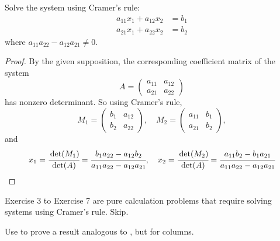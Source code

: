 \begin{exercise} \label{exercise 4.3.2}
Solve the system using Cramer's rule:
\begin{align*}
    a_{11} x_1 + a_{12} x_2 & = b_1 \\
    a_{21} x_1 + a_{22} x_2 & = b_2
\end{align*}
where \(a_{11} a_{22} - a_{12} a_{21} \ne 0\).
\end{exercise}

\begin{proof}
By the given supposition, the corresponding coefficient matrix of the system
\[
    A = \begin{pmatrix} a_{11} & a_{12} \\ a_{21} & a_{22} \end{pmatrix}
\]
has nonzero determinant.
So using  Cramer's rule,
\[
    M_1 = \begin{pmatrix} b_1 & a_{12} \\ b_2 & a_{22} \end{pmatrix}, \quad
    M_2 = \begin{pmatrix} a_{11} & b_1 \\ a_{21} & b_2 \end{pmatrix},
\]
and
\[
    x_1 = \cfrac{\det(M_1)}{\det(A)} = \cfrac{b_1 a_{22} - a_{12} b_2}{a_{11} a_{22} - a_{12} a_{21}},
    \quad
    x_2 = \cfrac{\det(M_2)}{\det(A)} = \cfrac{a_{11} b_2 - b_1 a_{21}}{a_{11} a_{22} - a_{12} a_{21}}
\]
\end{proof}

Exercise 3 to Exercise 7 are pure calculation problems that require solving systems using Cramer's rule. Skip.

\setcounter{exercise}{7}
\begin{exercise} \label{exercise 4.3.8}
Use  to prove a result analogous to , but for columns.
\end{exercise}

